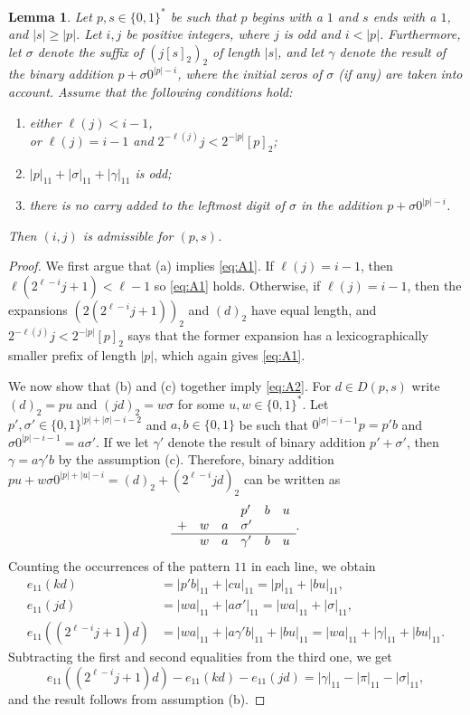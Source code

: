 \documentclass[a4paper,11pt]{amsart}
\newtheorem{lem}[thm]{Lemma}
\theoremstyle{definition}
\begin{document}
\begin{lem} \label{lem:main_idea}
Let $p,s \in \{0,1\}^*$ be such that $p$ begins with a $1$ and $s$ ends with a $1$, and $|s| \geq |p|$. Let $i,j$ be positive integers, where $j$ is odd and $i < |p|$. Furthermore, let $\sigma$ denote the suffix of $(j[s]_2)_2$ of length $|s|$, and let $\gamma$ denote the result of the binary addition $p + \sigma 0^{|p|-i}$, where the initial zeros of $\sigma$ (if any) are taken into account. Assume that the following conditions hold:
\begin{enumerate}[label={\textup{(\alph*)}}]
\item either $\ell(j) < i-1$, \\
or $\ell(j) = i-1$ and $2^{-\ell(j)} j < 2^{-|p|} [p]_2$;
\item $|p|_{11}+ |\sigma|_{11}+|\gamma|_{11}$ is odd;
\item there is no carry added to the leftmost digit of $\sigma$ in the addition $p + \sigma 0^{|p|-i}$.
\end{enumerate}
Then $(i,j)$ is admissible for $(p,s)$.
\end{lem}
\begin{proof}
We first argue that (a) implies \ref{eq:A1}. If $\ell(j) = i-1$, then $\ell(2^{\ell-i}j+1) < \ell-1$ so \eqref{eq:A1} holds. Otherwise, if $\ell(j) = i-1$, then the expansions $(2(2^{\ell-i}j+1))_2$ and $(d)_2$ have equal length, and $2^{-\ell(j)} j < 2^{-|p|} [p]_2$ says that the former expansion has a lexicographically smaller prefix of length $|p|$, which again gives \eqref{eq:A1}.

We now show that (b) and (c) together imply \eqref{eq:A2}.
For $d \in D(p,s)$ write $(d)_2 = pu$ and $(jd)_2 = w \sigma$ for some $u,w \in \{0,1\}^*$. 
Let $p',\sigma' \in \{0,1\}^{|p|+|\sigma|-i-2}$ and $a,b \in \{0,1\}$ be such that $0^{|\sigma|-i-1}p=p'b$ and $\sigma 0^{|p|-i-1}=a\sigma'$. If we let $\gamma'$ denote the result of binary addition $p'+\sigma'$, then $\gamma=a\gamma'b$ by the assumption (c). Therefore, binary addition $ pu + w\sigma 0^{|p|+|u|-i} = (d)_2+ (2^{\ell-i} jd)_2$ can be written as
$$
\begin{array}{llllll}
		&   &   & p'  	      &  b & u  \\
+    	& w & a & \sigma'     &    &  	\\   	
\hline  & w & a & \gamma'  	  &  b & u
\end{array}.
$$
Counting the occurrences of the pattern $11$ in each line, we obtain
\begin{align*}
e_{11}(kd) &= |p'b|_{11}+|cu|_{11} = |p|_{11} + |bu|_{11}, \\
e_{11}(jd) &= |wa|_{11}+|a \sigma'|_{11} = |wa|_{11} + |\sigma|_{11},\\
e_{11}((2^{\ell-i} j+1)d) &= |wa|_{11} + |a\gamma'b|_{11} + |bu|_{11} = |wa|_{11} + |\gamma|_{11} + |bu|_{11}.
\end{align*}
Subtracting the first and second equalities from the third one, we get
$$ e_{11}((2^{\ell-i}j+1)d) - e_{11}(kd) - e_{11}(jd) = |\gamma|_{11} - |\pi|_{11} - |\sigma|_{11},   $$
and the result follows from assumption (b).
\end{proof}
\end{document}
